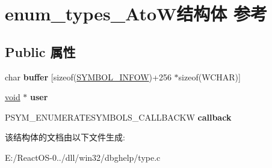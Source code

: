 \hypertarget{structenum__types___ato_w}{}\section{enum\+\_\+types\+\_\+\+Ato\+W结构体 参考}
\label{structenum__types___ato_w}
\subsection*{Public 属性}
\begin{DoxyCompactItemize}
\item 
\mbox{\label{structenum__types___ato_w_ad9797aae71a0f0c40f7b328571c00594}} 
char {\bfseries buffer} \mbox{[}sizeof(\hyperlink{struct___s_y_m_b_o_l___i_n_f_o_w}{S\+Y\+M\+B\+O\+L\+\_\+\+I\+N\+F\+OW})+256 $\ast$sizeof(W\+C\+H\+AR)\mbox{]}
\item 
\mbox{\label{structenum__types___ato_w_a6ae104fb831ef003e4ab6d03855f9b44}} 
\hyperlink{interfacevoid}{void} $\ast$ {\bfseries user}
\item 
\mbox{\label{structenum__types___ato_w_ac13c2a24b70d0c2363218b8b87ee3a6e}} 
P\+S\+Y\+M\+\_\+\+E\+N\+U\+M\+E\+R\+A\+T\+E\+S\+Y\+M\+B\+O\+L\+S\+\_\+\+C\+A\+L\+L\+B\+A\+C\+KW {\bfseries callback}
\end{DoxyCompactItemize}


该结构体的文档由以下文件生成\+:\begin{DoxyCompactItemize}
\item 
E\+:/\+React\+O\+S-\/0../dll/win32/dbghelp/type.\+c\end{DoxyCompactItemize}
